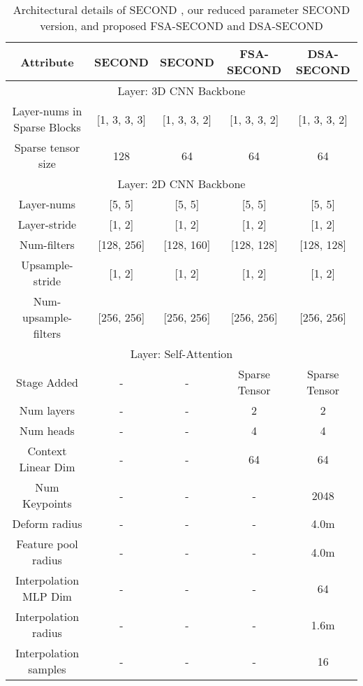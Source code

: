 \documentclass[10pt,twocolumn,letterpaper]{article}
\begin{document}
\begin{table*}[t]
    \centering
    \begin{tabular*}{\textwidth}{|c||c|c|c|c|}
        \hline
        Attribute & SECOND \cite{SECOND} & SECOND & FSA-SECOND & DSA-SECOND \\
        \hline
        \hline
        \multicolumn{5}{|c|}{Layer: 3D CNN Backbone}  \\ \cline{1-5}
        \hline
         Layer-nums in Sparse Blocks & [1, 3, 3, 3] & [1, 3, 3, 2] & [1, 3, 3, 2] & [1, 3, 3, 2]\\
         \hline
         Sparse tensor size & 128 & 64 & 64 & 64 \\
         \hline
         \hline
         \multicolumn{5}{|c|}{Layer: 2D CNN Backbone}  \\ 
        \hline
        \hline
         Layer-nums & [5, 5] & [5, 5] & [5, 5] & [5, 5]\\
         \hline
         Layer-stride & [1, 2] & [1, 2] & [1, 2] & [1, 2] \\
         \hline
         Num-filters & [128, 256] & [128, 160] & [128, 128] & [128, 128] \\
         \hline
         Upsample-stride & [1, 2] & [1, 2] & [1, 2] & [1, 2] \\
         \hline
         Num-upsample-filters & [256, 256] & [256, 256] & [256, 256] & [256, 256] \\
         \hline
         \hline
        \multicolumn{5}{|c|}{Layer: Self-Attention}  \\ 
        \hline
        \hline
        Stage Added & - & - & Sparse Tensor & Sparse Tensor \\
         \hline
          Num layers & - & - & 2 & 2 \\
         \hline
          Num heads & - & - & 4 & 4 \\
          \hline
         Context Linear Dim & - & - & 64 & 64 \\
         \hline
         Num Keypoints & - & - & - & 2048 \\
         \hline
         Deform radius & - & - & - & 4.0m \\
         \hline
         Feature pool radius & - & - & - & 4.0m \\
         \hline
         Interpolation MLP Dim & - & - & - & 64 \\
         \hline
         Interpolation radius & - & - & - & 1.6m \\
         \hline
         Interpolation samples & - & - & - & 16 \\
         \hline
         
    \end{tabular*}
    \caption{Architectural details of SECOND \cite{SECOND}, our reduced parameter SECOND version, and proposed FSA-SECOND and DSA-SECOND}
    \label{tab:second_archi}
\end{table*} \setlength{\tabcolsep}{0.43pt}
\end{document}
